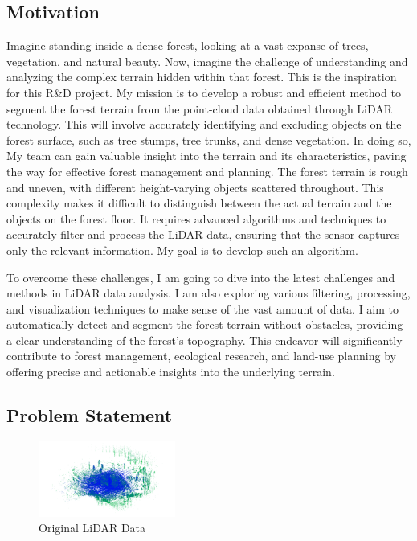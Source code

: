\documentclass[../report.tex]{subfiles}
\begin{document}
    \subsection{Motivation}
    \label{sec:introduction:motivation}
Imagine standing inside a dense forest, looking at a vast expanse of trees, vegetation, and natural beauty. Now, imagine the challenge of understanding and analyzing the complex terrain hidden within that forest. This is the inspiration for this R\&D project. My mission is to develop a robust and efficient method to segment the forest terrain from the point-cloud data obtained through LiDAR technology. This will involve accurately identifying and excluding objects on the forest surface, such as tree stumps, tree trunks, and dense vegetation. In doing so, My team can gain valuable insight into the terrain and its characteristics, paving the way for effective forest management and planning.
{The forest terrain is rough and uneven, with different height-varying objects scattered throughout. This complexity makes it difficult to distinguish between the actual terrain and the objects on the forest floor. It requires advanced algorithms and techniques to accurately filter and process the LiDAR data, ensuring that the sensor captures only the relevant information. My goal is to develop such an algorithm.}

{To overcome these challenges, I am going to dive into the latest challenges and methods in LiDAR data analysis. I am also exploring various filtering, processing, and visualization techniques to make sense of the vast amount of data. I aim to automatically detect and segment the forest terrain without obstacles, providing a clear understanding of the forest's topography. This endeavor will significantly contribute to forest management, ecological research, and land-use planning by offering precise and actionable insights into the underlying terrain.}
    
    \subsection{Problem Statement}
    \label{sec:introduction:problem_statement}
    \begin{figure}[H]
        \centering
        \includegraphics[width=0.4\textwidth]{rnd-project-report-main/figures/Original_data.png}
        \caption{Original LiDAR Data}
        \label{fig:raw_data}
    \end{figure}
    
\end{document}
